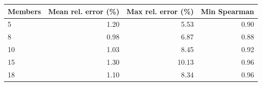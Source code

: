 \begin{tabular}{lrrr}
\toprule
Members & Mean rel. error (\%) & Max rel. error (\%) & Min Spearman \\
\midrule
5 & 1.20 & 5.53 & 0.90 \\
8 & 0.98 & 6.87 & 0.88 \\
10 & 1.03 & 8.45 & 0.92 \\
15 & 1.30 & 10.13 & 0.96 \\
18 & 1.10 & 8.34 & 0.96 \\
\bottomrule
\end{tabular}

